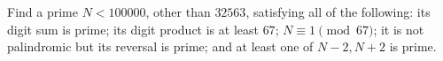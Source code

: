 Find a prime $N<100000$, other than $32563$, satisfying all of the following: its digit sum is prime; its digit product is at least $67$; $N\equiv1\pmod{67}$; it is not palindromic but its reversal is prime; and at least one of $N-2,N+2$ is prime.
